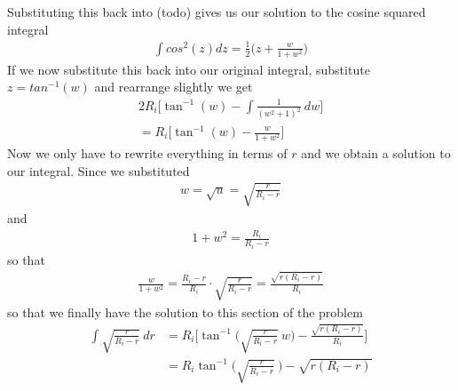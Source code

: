 \documentclass{article}
\begin{document}
Substituting this back into (todo) gives us our solution to the cosine squared integral
\begin{align}
    \int cos^2(z) dz = \frac{1}{2} \bigl(z + \frac{w}{1+w^2}\bigr)
\end{align}
If we now substitute this back into our original integral, substitute $z = tan^{-1}(w)$ and rearrange slightly we get
\begin{align}
    2R_i \Biggl[ \tan^{-1}(w) - \int \frac{1}{(w^2 + 1)^2} ~dw \Biggr]\\
    = R_i \Biggl[ \tan^{-1}(w) - \frac{w}{1+w^2}\Biggr]
\end{align}
Now we only have to rewrite everything in terms of $r$ and we obtain a solution to our integral. Since
we substituted
\begin{align}
    w = \sqrt{u} = \sqrt{\frac{r}{R_i - r}}
\end{align}
and
\begin{align}
    {1+w^2} = \frac{R_i}{R_i - r} 
\end{align}
so that
\begin{align}
    \frac{w}{1+w^2} = \frac{R_i - r}{R_i} \cdot \sqrt{\frac{r}{R_i-r}} = \frac{\sqrt{r( R_i - r)}}{R_i} 
\end{align}
so that we finally have the solution to this section of the problem
\begin{align}
    \int \sqrt{\frac{r}{R_i - r}} ~ dr &= R_i \Biggl[ \tan^{-1}\biggl(\sqrt{\frac{r}{R_i - r}}~w\biggr) - \frac{\sqrt{r( R_i - r)}}{R_i}  \Biggr]\\
    &= R_i \tan^{-1}\biggl(\sqrt{\frac{r}{R_i - r}} ~ \biggr) -\sqrt{r( R_i - r)}
\end{align}
\end{document}
